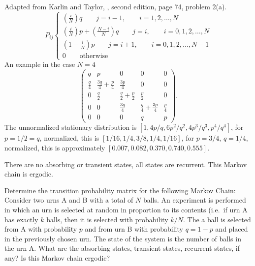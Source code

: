 \documentclass[12pt]{article}
\begin{document}
\begin{solution}
    Adapted from Karlin and Taylor, , second edition, page 74, problem 2(a).
    \[
        P_{ij}
        \begin{cases}
            \left( \frac{i}{N}\right)q \qquad j = i-1, \qquad i=1,2,\dots,N
            \\
            \left( \frac{i}{N} \right) p + \left( \frac{N-i}{N} \right)
            q \qquad j = i, \qquad i=0,1,2,\dots,N \\
            \left( 1- \frac{i}{N} \right) p \qquad j = i+1, \qquad
            i=0,1,2,\dots,N-1 \\
            0 \qquad \text{otherwise}
        \end{cases}
    \] An example in the case \( N=4 \)
    \[
        \begin{pmatrix}
            q & p & 0 & 0 & 0\\
            \frac{q}{4} & \frac{3q}{4}+\frac{p}{4} & \frac{3p}{4} & 0 &
            0\\
            0 & \frac{q}{2} & \frac{q}{2}+\frac{p}{2} & \frac{p}{2} & 0\\
            0 & 0 & \frac{3q}{4} & \frac{q}{4}+\frac{3p}{4} & \frac{p}{4}\\
            0 & 0 & 0 & q & p
        \end{pmatrix}
        .
    \] The unnormalized stationary distribution is \( [1, 4p/q, 6p^2/q^2,
    4p^3/q^3, p^4/q^4 ] \), for \( p = 1/2 = q \), normalized, this is \(
    [ 1/16, 1/4, 3/8, 1/4, 1/16] \), for \( p =3/4 \), \( q = 1/4 \),
    normalized, this is approximately \( [0.007, 0.082, 0.370, 0.740,
    0.555] \).

    There are no absorbing or transient states, all states are
    recurrent.  This Markov chain is ergodic.
\end{solution}
\begin{exercise}
    Determine the transition probability matrix for the following Markov
    Chain:  Consider two urns A and B with a total of \( N \) balls.  An
    experiment is performed in which an urn is selected at random in
    proportion to its contents (i.e.\ if urn A has exactly \( k \)
    balls, then it is selected with probability \( k/N \). The a ball is
    selected from A with probability \( p \) and from urn B with
    probability \( q = 1-p \) and placed in the previously chosen urn.
    The state of the system is the number of balls in the urn A. What
    are the absorbing states, transient states, recurrent states, if
    any?  Is this Markov chain ergodic?
\end{exercise}
\end{document}
